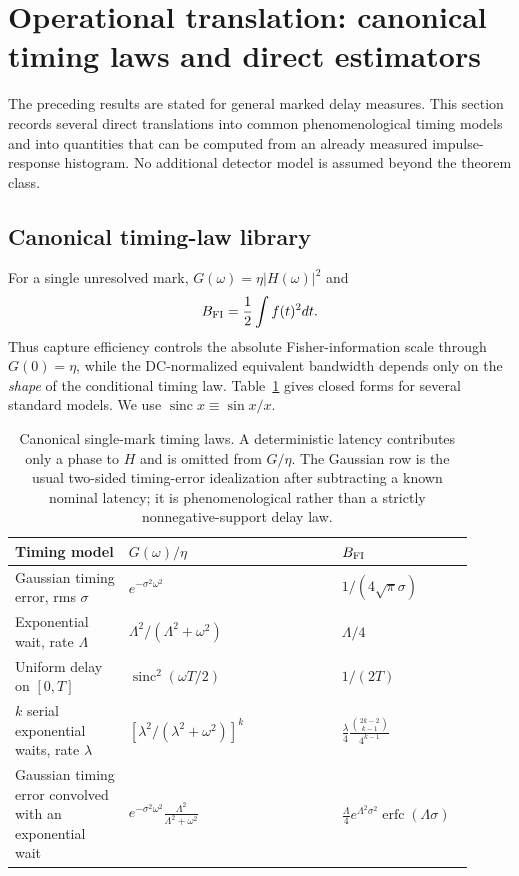 \section{Operational translation: canonical timing laws and direct estimators}
\label{sec:practical}

The preceding results are stated for general marked delay measures. This section records several direct translations into common phenomenological timing models and into quantities that can be computed from an already measured impulse-response histogram. No additional detector model is assumed beyond the theorem class.

\subsection{Canonical timing-law library}

For a single unresolved mark, $G(\omega)=\eta |H(\omega)|^2$ and
\begin{equation}
B_{\rm FI}=\frac12\int f(t)^2dt.
\label{eq:singleMarkBFI}
\end{equation}
Thus capture efficiency controls the absolute Fisher-information scale through $G(0)=\eta$, while the DC-normalized equivalent bandwidth depends only on the \emph{shape} of the conditional timing law. Table~\ref{tab:canonicalIRFs} gives closed forms for several standard models. We use $\operatorname{sinc}x\equiv\sin x/x$.

\begin{table}[t]
\caption{Canonical single-mark timing laws. A deterministic latency contributes only a phase to $H$ and is omitted from $G/\eta$. The Gaussian row is the usual two-sided timing-error idealization after subtracting a known nominal latency; it is phenomenological rather than a strictly nonnegative-support delay law.}
\label{tab:canonicalIRFs}
\begin{tabular}{p{0.23\linewidth}p{0.43\linewidth}p{0.25\linewidth}}
\toprule
Timing model & $G(\omega)/\eta$ & $B_{\rm FI}$ \\
\midrule
Gaussian timing error, rms $\sigma$ & $e^{-\sigma^2\omega^2}$ & $1/(4\sqrt{\pi}\sigma)$ \\
Exponential wait, rate $\Lambda$ & $\Lambda^2/(\Lambda^2+\omega^2)$ & $\Lambda/4$ \\
Uniform delay on $[0,T]$ & $\operatorname{sinc}^2(\omega T/2)$ & $1/(2T)$ \\
$k$ serial exponential waits, rate $\lambda$ & $[\lambda^2/(\lambda^2+\omega^2)]^k$ & $\displaystyle \frac{\lambda}{4}\frac{\binom{2k-2}{k-1}}{4^{k-1}}$ \\
Gaussian timing error convolved with an exponential wait & $\displaystyle e^{-\sigma^2\omega^2}\frac{\Lambda^2}{\Lambda^2+\omega^2}$ & $\displaystyle \frac{\Lambda}{4}e^{\Lambda^2\sigma^2}\operatorname{erfc}(\Lambda\sigma)$ \\
\bottomrule
\end{tabular}
\end{table}

